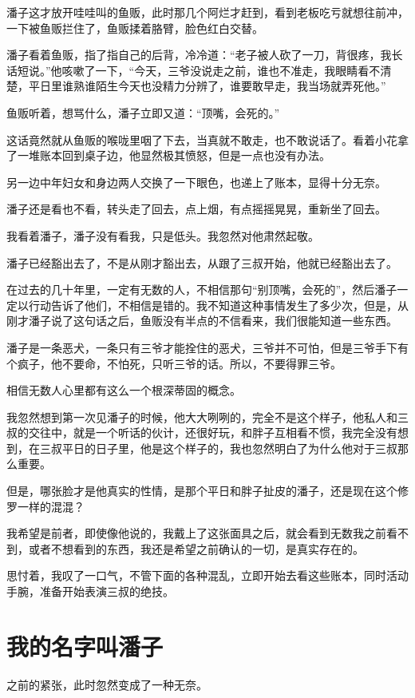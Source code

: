 潘子这才放开哇哇叫的鱼贩，此时那几个阿烂才赶到，看到老板吃亏就想往前冲，一下被鱼贩拦住了，鱼贩揉着胳臂，脸色红白交替。

潘子看着鱼贩，指了指自己的后背，冷冷道：“老子被人砍了一刀，背很疼，我长话短说。”他咳嗽了一下，“今天，三爷没说走之前，谁也不准走，我眼睛看不清楚，平日里谁熟谁陌生今天也没精力分辨了，谁要敢早走，我当场就弄死他。”

鱼贩听着，想骂什么，潘子立即又道：“顶嘴，会死的。”

这话竟然就从鱼贩的喉咙里咽了下去，当真就不敢走，也不敢说话了。看着小花拿了一堆账本回到桌子边，他显然极其愤怒，但是一点也没有办法。

另一边中年妇女和身边两人交换了一下眼色，也递上了账本，显得十分无奈。

潘子还是看也不看，转头走了回去，点上烟，有点摇摇晃晃，重新坐了回去。

我看着潘子，潘子没有看我，只是低头。我忽然对他肃然起敬。

潘子已经豁出去了，不是从刚才豁出去，从跟了三叔开始，他就已经豁出去了。

在过去的几十年里，一定有无数的人，不相信那句“别顶嘴，会死的”，然后潘子一定以行动告诉了他们，不相信是错的。我不知道这种事情发生了多少次，但是，从刚才潘子说了这句话之后，鱼贩没有半点的不信看来，我们很能知道一些东西。

潘子是一条恶犬，一条只有三爷才能拴住的恶犬，三爷并不可怕，但是三爷手下有个疯子，他不要命，不怕死，只听三爷的话。所以，不要得罪三爷。

相信无数人心里都有这么一个根深蒂固的概念。

我忽然想到第一次见潘子的时候，他大大咧咧的，完全不是这个样子，他私人和三叔的交往中，就是一个听话的伙计，还很好玩，和胖子互相看不惯，我完全没有想到，在三叔平日的日子里，他是这个样子的，我也忽然明白了为什么他对于三叔那么重要。

但是，哪张脸才是他真实的性情，是那个平日和胖子扯皮的潘子，还是现在这个修罗一样的混混？

我希望是前者，即使像他说的，我戴上了这张面具之后，就会看到无数我之前看不到，或者不想看到的东西，我还是希望之前确认的一切，是真实存在的。

思忖着，我叹了一口气，不管下面的各种混乱，立即开始去看这些账本，同时活动手腕，准备开始表演三叔的绝技。

\chapter{我的名字叫潘子}

之前的紧张，此时忽然变成了一种无奈。

